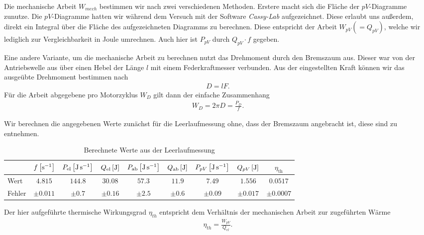 Die mechanische Arbeit $W_{mech}$ bestimmen wir nach zwei verschiedenen Methoden. Erstere macht sich die Fläche der $pV$-Diagramme zunutze. Die $pV$-Diagramme hatten wir während dem Versuch mit der Software \textit{Cassy-Lab} aufgezeichnet. Diese erlaubt uns außerdem, direkt ein Integral über die Fläche des aufgezeichneten Diagramms zu berechnen. Diese entspricht der Arbeit $W_{pV} (= Q_{pV})$, welche wir lediglich zur Vergleichbarkeit in Joule umrechnen. Auch hier ist $P_{pV}$ durch $Q_{pV}\cdot f$ gegeben.

Eine andere Variante, um die mechanische Arbeit zu berechnen nutzt das Drehmoment durch den Bremszaum aus. Dieser war von der Antriebswelle aus über einen Hebel der Länge $l$ mit einem Federkraftmesser verbunden. Aus der eingestellten Kraft können wir das ausgeübte Drehmoment bestimmen nach
\begin{align}
    D = l F.
\end{align}
Für die Arbeit abgegebene pro Motorzyklus $W_D$ gilt dann der einfache Zusammenhang
\begin{align}
    W_D = 2 \pi D = \frac{P_D}{f}.
\end{align}

Wir berechnen die angegebenen Werte zunächst für die Leerlaufmessung ohne, dass der Bremszaum angebracht ist, diese sind  zu entnehmen. 

\begin{table}[h!]
    \centering
    \begin{tabular}{l | c | c | c | c | c | c | c | c}
    \textbf{} & \boldmath$f\,\qty[\si{\per\second}]$ & \boldmath$P_{\text{el}}\,\qty[\si{\joule\per\second}]$ & \boldmath$Q_{\text{el}}\,\qty[\si{\joule}]$ & \boldmath$P_{\text{ab}}\,\qty[\si{\joule\per\second}]$ & \boldmath$Q_{\text{ab}}\,\qty[\si{\joule}]$ & \boldmath$P_{pV}\,\qty[\si{\joule\per\second}]$ & \boldmath$Q_{pV}\,\qty[\si{\joule}]$ & \boldmath$\eta_{\text{th}}$ \\\hline
    Wert & $4.815$ & $144.8$ & $30.08$ & $57.3$ & $11.9$ & $7.49$ & $1.556$ & $0.0517$ \\\hline
    Fehler & $\pm 0.011$ & $\pm 0.7$ & $\pm 0.16$ & $\pm 2.5$ & $\pm 0.6$ & $\pm 0.09$ & $\pm 0.017$ & $\pm 0.0007$ \\
    \end{tabular}
    \caption{Berechnete Werte aus der Leerlaufmessung}
    \label{tab:werte_leerlauf}
\end{table}

Der hier aufgeführte thermische Wirkungsgrad $\eta_{th}$ entspricht dem Verhältnis der mechanischen Arbeit zur zugeführten Wärme
\begin{align}
    \eta_{th} = \frac{W_{pV}}{Q_{el}}.
\end{align}

